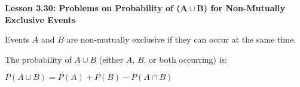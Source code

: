 \begin{center}
\textbf{Lesson 3.30: Problems on Probability of (\(\mathbf{A \cup B}\)) for Non-Mutually Exclusive Events}
\end{center}

\vspace*{-1.5ex}

\noindent Events \( A \) and \( B \) are non-mutually exclusive if they can occur at the same time.%

\noindent The probability of \( A \cup B \) (either \( A \), \( B \), or both occurring) is:

{\centering $ 
          P(A \cup B) = P(A) + P(B) - P(A \cap B)
          $\par}
        

